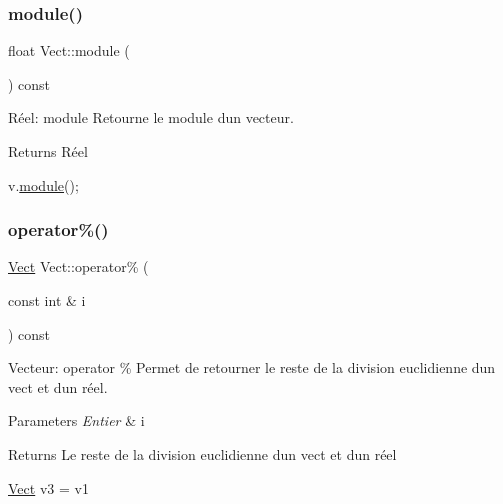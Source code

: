 \subsubsection{\texorpdfstring{module()}{module()}}
{\footnotesize\ttfamily float Vect\+::module (\begin{DoxyParamCaption}{ }\end{DoxyParamCaption}) const}



Réel\+: module Retourne le module d\textquotesingle{}un vecteur. 

\begin{DoxyReturn}{Returns}
Réel 
\begin{DoxyCode}
v.\hyperlink{classVect_aa61c71b79a4d2f2cda092648a7268c4f}{module}();
\end{DoxyCode}
 
\end{DoxyReturn}
\mbox{\label{classVect_a7c95db0096c212593a83992d8c9cc42a}} 
\subsubsection{\texorpdfstring{operator\%()}{operator\%()}}
{\footnotesize\ttfamily \hyperlink{classVect}{Vect} Vect\+::operator\% (\begin{DoxyParamCaption}\item[{const int \&}]{i }\end{DoxyParamCaption}) const}



Vecteur\+: operator \% Permet de retourner le reste de la division euclidienne d\textquotesingle{}un vect et d\textquotesingle{}un réel. 


\begin{DoxyParams}{Parameters}
{\em Entier} & i \\
\hline
\end{DoxyParams}
\begin{DoxyReturn}{Returns}
Le reste de la division euclidienne d\textquotesingle{}un vect et d\textquotesingle{}un réel 
\begin{DoxyCode}
\hyperlink{classVect}{Vect} v3 = v1 %
\end{DoxyCode}
 
\end{DoxyReturn}
\mbox{\label{classVect_ab3dce1a30e0626a88cd726aa0d4f78e5}} 
